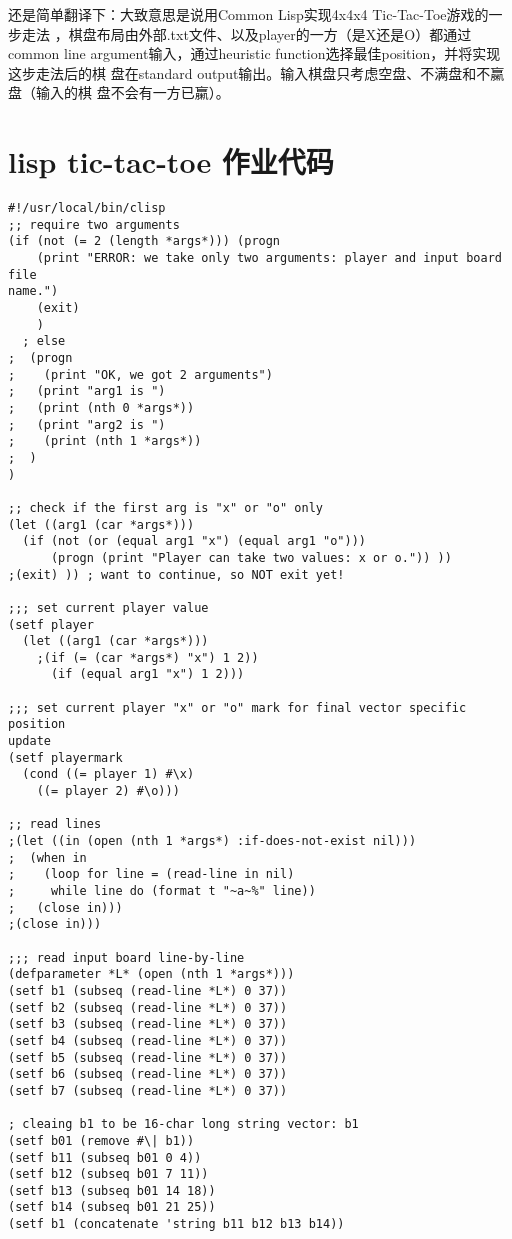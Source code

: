 \documentclass[12pt]{book}
\begin{document}
还是简单翻译下：大致意思是说用Common Lisp实现4x4x4 Tic-Tac-Toe游戏的一步走法
，棋盘布局由外部.txt文件、以及player的一方（是X还是O）都通过common line 
argument输入，通过heuristic function选择最佳position，并将实现这步走法后的棋
盘在standard output输出。输入棋盘只考虑空盘、不满盘和不䊨盘（输入的棋
盘不会有一方已䊨）。
\section{lisp tic-tac-toe 作业代码}
\label{sec-12-10}

\lstset{language=Lisp,label= ,caption= ,numbers=none}
\begin{lstlisting}
#!/usr/local/bin/clisp
;; require two arguments
(if (not (= 2 (length *args*))) (progn
    (print "ERROR: we take only two arguments: player and input board file 
name.")
    (exit)
    )
  ; else
;  (progn
;    (print "OK, we got 2 arguments")
;   (print "arg1 is ")
;   (print (nth 0 *args*))
;   (print "arg2 is ")
;    (print (nth 1 *args*))
;  )
)

;; check if the first arg is "x" or "o" only
(let ((arg1 (car *args*)))
  (if (not (or (equal arg1 "x") (equal arg1 "o")))
      (progn (print "Player can take two values: x or o.")) ))
;(exit) )) ; want to continue, so NOT exit yet!

;;; set current player value
(setf player 
  (let ((arg1 (car *args*)))
    ;(if (= (car *args*) "x") 1 2))
      (if (equal arg1 "x") 1 2)))

;;; set current player "x" or "o" mark for final vector specific position 
update
(setf playermark 
  (cond ((= player 1) #\x)
    ((= player 2) #\o)))

;; read lines
;(let ((in (open (nth 1 *args*) :if-does-not-exist nil)))
;  (when in
;    (loop for line = (read-line in nil)
;     while line do (format t "~a~%" line))
;   (close in)))
;(close in)))

;;; read input board line-by-line
(defparameter *L* (open (nth 1 *args*)))
(setf b1 (subseq (read-line *L*) 0 37))
(setf b2 (subseq (read-line *L*) 0 37))
(setf b3 (subseq (read-line *L*) 0 37))
(setf b4 (subseq (read-line *L*) 0 37))
(setf b5 (subseq (read-line *L*) 0 37))
(setf b6 (subseq (read-line *L*) 0 37))
(setf b7 (subseq (read-line *L*) 0 37))

; cleaing b1 to be 16-char long string vector: b1
(setf b01 (remove #\| b1))
(setf b11 (subseq b01 0 4))
(setf b12 (subseq b01 7 11))
(setf b13 (subseq b01 14 18))
(setf b14 (subseq b01 21 25))
(setf b1 (concatenate 'string b11 b12 b13 b14))


\end{lstlisting}
\end{document}
